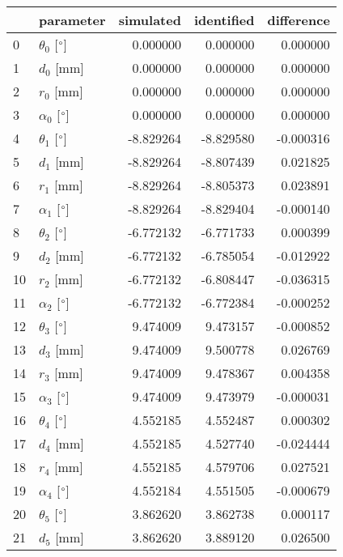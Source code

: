 \documentclass{standalone}%
\begin{document}
%
\normalsize%
\begin{tabular}{llrrr}
\toprule
{} &                 parameter & simulated & identified & difference \\
\midrule
0  &  $\theta_{0}$ [$\degree$] &  0.000000 &   0.000000 &   0.000000 \\
1  &              $d_{0}$ [mm] &  0.000000 &   0.000000 &   0.000000 \\
2  &              $r_{0}$ [mm] &  0.000000 &   0.000000 &   0.000000 \\
3  &  $\alpha_{0}$ [$\degree$] &  0.000000 &   0.000000 &   0.000000 \\
4  &  $\theta_{1}$ [$\degree$] & -8.829264 &  -8.829580 &  -0.000316 \\
5  &              $d_{1}$ [mm] & -8.829264 &  -8.807439 &   0.021825 \\
6  &              $r_{1}$ [mm] & -8.829264 &  -8.805373 &   0.023891 \\
7  &  $\alpha_{1}$ [$\degree$] & -8.829264 &  -8.829404 &  -0.000140 \\
8  &  $\theta_{2}$ [$\degree$] & -6.772132 &  -6.771733 &   0.000399 \\
9  &              $d_{2}$ [mm] & -6.772132 &  -6.785054 &  -0.012922 \\
10 &              $r_{2}$ [mm] & -6.772132 &  -6.808447 &  -0.036315 \\
11 &  $\alpha_{2}$ [$\degree$] & -6.772132 &  -6.772384 &  -0.000252 \\
12 &  $\theta_{3}$ [$\degree$] &  9.474009 &   9.473157 &  -0.000852 \\
13 &              $d_{3}$ [mm] &  9.474009 &   9.500778 &   0.026769 \\
14 &              $r_{3}$ [mm] &  9.474009 &   9.478367 &   0.004358 \\
15 &  $\alpha_{3}$ [$\degree$] &  9.474009 &   9.473979 &  -0.000031 \\
16 &  $\theta_{4}$ [$\degree$] &  4.552185 &   4.552487 &   0.000302 \\
17 &              $d_{4}$ [mm] &  4.552185 &   4.527740 &  -0.024444 \\
18 &              $r_{4}$ [mm] &  4.552185 &   4.579706 &   0.027521 \\
19 &  $\alpha_{4}$ [$\degree$] &  4.552184 &   4.551505 &  -0.000679 \\
20 &  $\theta_{5}$ [$\degree$] &  3.862620 &   3.862738 &   0.000117 \\
21 &              $d_{5}$ [mm] &  3.862620 &   3.889120 &   0.026500 \\

\end{tabular}
\end{document}
